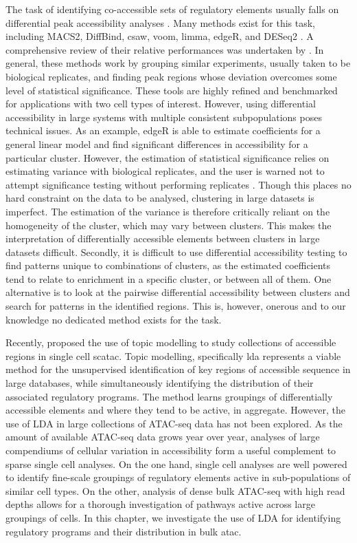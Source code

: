 The task of identifying co-accessible sets of regulatory elements usually falls on differential peak accessibility analyses \cite{Yan2020}. Many methods exist for this task, including MACS2, DiffBind, csaw, voom, limma, edgeR, and DESeq2 \cite{Ritchie2015,Law2014,Love2014,Robinson2009,StarkRandBrown2016,Lun2015,Zhang2008}. A comprehensive review of their relative performances was undertaken by \textcite{Reske2020}. In general, these methods work by grouping similar experiments, usually taken to be biological replicates, and finding peak regions whose deviation overcomes some level of statistical significance. These tools are highly refined and benchmarked for applications with two cell types of interest. However, using differential accessibility in large systems with multiple consistent subpopulations poses technical issues. As an example, edgeR is able to estimate coefficients for a general linear model and find significant differences in accessibility for a particular cluster. However, the estimation of statistical significance relies on estimating variance with biological replicates, and the user is warned not to attempt significance testing without performing replicates \cite{Robinson2009}. Though this places no hard constraint on the data to be analysed, clustering in large datasets is imperfect. The estimation of the variance is therefore critically reliant on the homogeneity of the cluster, which may vary between clusters. This makes the interpretation of differentially accessible elements between clusters in large datasets difficult. Secondly, it is difficult to use differential accessibility testing to find patterns unique to combinations of clusters, as the estimated coefficients tend to relate to enrichment in a specific cluster, or between all of them. One alternative is to look at the pairwise differential accessibility between clusters and search for patterns in the identified regions. This is, however, onerous and to our knowledge no dedicated method exists for the task.  

Recently, \textcite{BravoGonzalez-Blas2019} proposed the use of topic modelling to study collections of accessible regions in single cell \gls{scatac}. Topic modelling, specifically \gls{lda} represents a viable method for the unsupervised identification of key regions of accessible sequence in large databases, while simultaneously identifying the distribution of their associated regulatory programs. The method learns groupings of differentially accessible elements and where they tend to be active, in aggregate. However, the use of LDA in large collections of ATAC-seq data has not been explored. As the amount of available ATAC-seq data grows year over year, analyses of large compendiums of cellular variation in accessibility form a useful complement to sparse single cell analyses. On the one hand, single cell analyses are well powered to identify fine-scale groupings of regulatory elements active in sub-populations of similar cell types. On the other, analysis of dense bulk ATAC-seq with high read depths allows for a thorough investigation of pathways active across large groupings of cells. In this chapter, we investigate the use of LDA for identifying regulatory programs and their distribution in bulk \gls{atac}.

